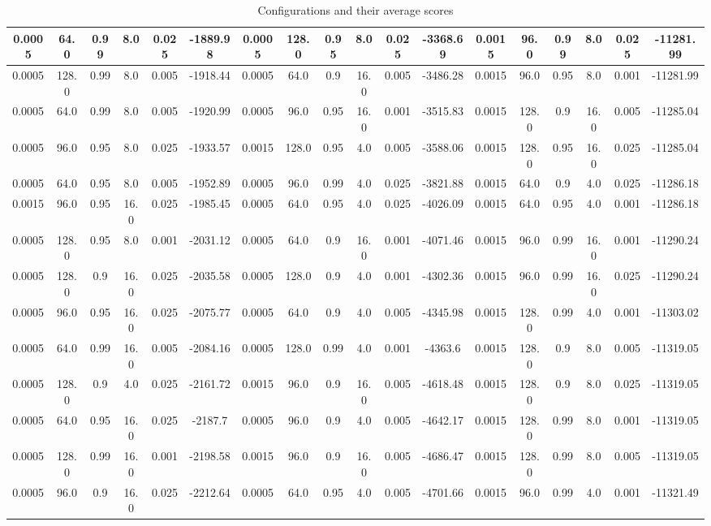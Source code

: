 \begin{table}[h]
\begin{tabular}{|c|c|c|c|c|c||c|c|c|c|c|c||c|c|c|c|c|c|}
    \hline
    0.0005 & 64.0 & 0.99 & 8.0 & 0.025 & -1889.98 & 0.0005 & 128.0 & 0.95 & 8.0 & 0.025 & -3368.69 & 0.0015 & 96.0 & 0.99 & 8.0 & 0.025 & -11281.99 \\
    \hline
    0.0005 & 128.0 & 0.99 & 8.0 & 0.005 & -1918.44 & 0.0005 & 64.0 & 0.9 & 16.0 & 0.005 & -3486.28 & 0.0015 & 96.0 & 0.95 & 8.0 & 0.001 & -11281.99 \\
    \hline
    0.0005 & 64.0 & 0.99 & 8.0 & 0.005 & -1920.99 & 0.0005 & 96.0 & 0.95 & 16.0 & 0.001 & -3515.83 & 0.0015 & 128.0 & 0.9 & 16.0 & 0.005 & -11285.04 \\
    \hline
    0.0005 & 96.0 & 0.95 & 8.0 & 0.025 & -1933.57 & 0.0015 & 128.0 & 0.95 & 4.0 & 0.005 & -3588.06 & 0.0015 & 128.0 & 0.95 & 16.0 & 0.025 & -11285.04 \\
    \hline
    0.0005 & 64.0 & 0.95 & 8.0 & 0.005 & -1952.89 & 0.0005 & 96.0 & 0.99 & 4.0 & 0.025 & -3821.88 & 0.0015 & 64.0 & 0.9 & 4.0 & 0.025 & -11286.18 \\
    \hline
    0.0015 & 96.0 & 0.95 & 16.0 & 0.025 & -1985.45 & 0.0005 & 64.0 & 0.95 & 4.0 & 0.025 & -4026.09 & 0.0015 & 64.0 & 0.95 & 4.0 & 0.001 & -11286.18 \\
    \hline
    0.0005 & 128.0 & 0.95 & 8.0 & 0.001 & -2031.12 & 0.0005 & 64.0 & 0.9 & 16.0 & 0.001 & -4071.46 & 0.0015 & 96.0 & 0.99 & 16.0 & 0.001 & -11290.24 \\
    \hline
    0.0005 & 128.0 & 0.9 & 16.0 & 0.025 & -2035.58 & 0.0005 & 128.0 & 0.9 & 4.0 & 0.001 & -4302.36 & 0.0015 & 96.0 & 0.99 & 16.0 & 0.025 & -11290.24 \\
    \hline
    0.0005 & 96.0 & 0.95 & 16.0 & 0.025 & -2075.77 & 0.0005 & 64.0 & 0.9 & 4.0 & 0.005 & -4345.98 & 0.0015 & 128.0 & 0.99 & 4.0 & 0.001 & -11303.02 \\
    \hline
    0.0005 & 64.0 & 0.99 & 16.0 & 0.005 & -2084.16 & 0.0005 & 128.0 & 0.99 & 4.0 & 0.001 & -4363.6 & 0.0015 & 128.0 & 0.9 & 8.0 & 0.005 & -11319.05 \\
    \hline
    0.0005 & 128.0 & 0.9 & 4.0 & 0.025 & -2161.72 & 0.0015 & 96.0 & 0.9 & 16.0 & 0.005 & -4618.48 & 0.0015 & 128.0 & 0.9 & 8.0 & 0.025 & -11319.05 \\
    \hline
    0.0005 & 64.0 & 0.95 & 16.0 & 0.025 & -2187.7 & 0.0005 & 96.0 & 0.9 & 4.0 & 0.005 & -4642.17 & 0.0015 & 128.0 & 0.99 & 8.0 & 0.001 & -11319.05 \\
    \hline
    0.0005 & 128.0 & 0.99 & 16.0 & 0.001 & -2198.58 & 0.0015 & 96.0 & 0.9 & 16.0 & 0.005 & -4686.47 & 0.0015 & 128.0 & 0.99 & 8.0 & 0.005 & -11319.05 \\
    \hline
    0.0005 & 96.0 & 0.9 & 16.0 & 0.025 & -2212.64 & 0.0005 & 64.0 & 0.95 & 4.0 & 0.005 & -4701.66 & 0.0015 & 96.0 & 0.99 & 4.0 & 0.001 & -11321.49 \\
    \hline
    \end{tabular}
    \caption{Configurations and their average scores}
    \label{tab:config_scores}
    \end{table}
    